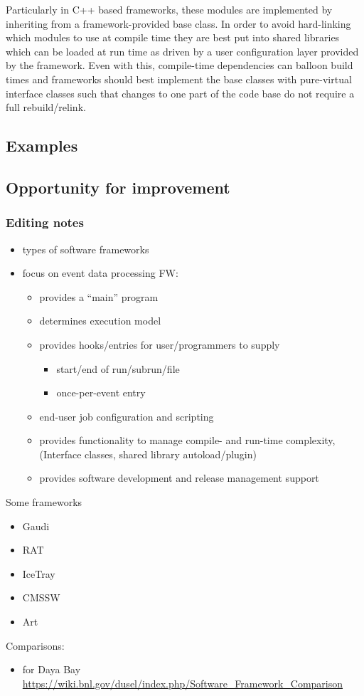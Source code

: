 	Particularly in C++ based frameworks,
these modules are implemented by inheriting from a framework-provided
base class. In order to avoid hard-linking which modules to use at
compile time they are best put into shared libraries which can be
loaded at run time as driven by a user configuration layer provided by
the framework.  Even with this, compile-time dependencies can balloon
build times and frameworks should best implement the base classes with
pure-virtual interface classes such that changes to one part of the
code base do not require a full rebuild/relink.

\subsection{Examples}
\subsection{Opportunity for improvement}



\subsubsection{Editing notes}



\begin{itemize}
\item types of software frameworks
\item focus on event data processing FW:
  \begin{itemize}
  \item provides a ``main'' program
  \item determines execution model
  \item provides hooks/entries for user/programmers to supply
    \begin{itemize}
    \item start/end of run/subrun/file
    \item once-per-event entry
    \end{itemize}
  \item end-user job configuration and scripting
  \item provides functionality to manage compile- and run-time complexity, (Interface classes, shared library autoload/plugin)
  \item provides software development and release management support
  \end{itemize}
\end{itemize}
Some frameworks
\begin{itemize}
\item Gaudi
\item RAT
\item IceTray
\item CMSSW
\item Art
\end{itemize}
Comparisons:
\begin{itemize}
\item for Daya Bay \url{https://wiki.bnl.gov/dusel/index.php/Software_Framework_Comparison}
\end{itemize}
